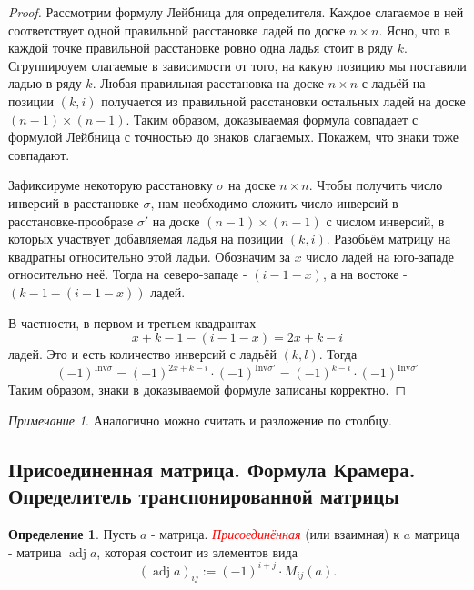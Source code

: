 \documentclass[a4paper,100pt]{article}
\theoremstyle{indented}
\theoremstyle{definition}
\newtheorem{defn}{Определение}
\theoremstyle{remark}
\newtheorem{remark}{Примечание}
\DeclareMathOperator{\adj}{adj}
\begin{document}
\begin{proof}
    Рассмотрим формулу Лейбница для определителя. Каждое слагаемое в ней соответствует одной правильной расстановке ладей по доске $n\times n$. Ясно, что в каждой точке правильной расстановке ровно одна ладья стоит в ряду $k$. Сгруппироуем слагаемые в зависимости от того, на какую позицию мы поставили ладью в ряду $k$. Любая правильная расстановка на доске $n\times n$ с ладьёй на позиции $(k, i)$ получается из правильной расстановки остальных ладей на доске $(n-1)\times(n-1)$. Таким образом, доказываемая формула совпадает с формулой Лейбница с точностью до знаков слагаемых. Покажем, что знаки тоже совпадают.\ 

    Зафиксируме некоторую расстановку $\sigma$ на доске $n\times n$. Чтобы получить число инверсий в расстановке $\sigma$, нам необходимо сложить число инверсий в расстановке-прообразе $\sigma '$ на доске $(n-1)\times (n-1)$ с числом инверсий, в которых участвует добавляемая ладья на позиции $(k, i)$. Разобьём матрицу на квадратны относительно этой ладьи. Обозначим за $x$ число ладей на юго-западе относительно неё. Тогда на северо-западе - $(i-1-x)$, а на востоке - $(k-1-(i-1-x))$ ладей.\ 

    В частности, в первом и третьем квадрантах 
    \[
        x+k-1-(i-1-x)=2x+k-i
    \]
    ладей. Это и есть количество инверсий с ладьёй $(k,l)$. Тогда 
    \[
        (-1)^{\text{Inv}\sigma}=(-1)^{2x+k-i}\cdot(-1)^{\text{Inv}\sigma'}=(-1)^{k-i}\cdot(-1)^{\text{Inv}\sigma'}
    \]
    Таким образом, знаки в доказываемой формуле записаны корректно.
\end{proof}

\begin{remark}
    Аналогично можно считать и разложение по столбцу.
\end{remark}

\resetall

\subsection{Присоединенная матрица. Формула Крамера. Определитель транспонированной матрицы}

\begin{defn}
    Пусть $a$ - матрица. \hypertarget{n101}{\textcolor{red}{\textit{Присоединённая}}} (или взаимная) к $a$ матрица - матрица $\adj a$, которая состоит из элементов вида 
    \[
        (\adj a)_{ij}:=(-1)^{i+j}\cdot M_{ij}(a).
    \]
\end{defn}
\end{document}
